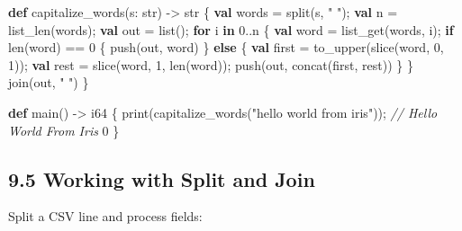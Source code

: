\documentclass[
  english,
]{book}
\newenvironment{Shaded}{\begin{snugshade}}{\end{snugshade}}
\newcommand{\CommentTok}[1]{\textcolor[rgb]{0.42,0.60,0.33}{\textit{#1}}}
\newcommand{\ControlFlowTok}[1]{\textcolor[rgb]{0.77,0.53,0.75}{\textbf{#1}}}
\newcommand{\DataTypeTok}[1]{\textcolor[rgb]{0.31,0.79,0.69}{#1}}
\newcommand{\DecValTok}[1]{\textcolor[rgb]{0.71,0.81,0.66}{#1}}
\newcommand{\FunctionTok}[1]{\textcolor[rgb]{0.86,0.86,0.67}{#1}}
\newcommand{\KeywordTok}[1]{\textcolor[rgb]{0.34,0.61,0.84}{\textbf{#1}}}
\newcommand{\NormalTok}[1]{\textcolor[rgb]{0.83,0.83,0.83}{#1}}
\newcommand{\OperatorTok}[1]{\textcolor[rgb]{0.83,0.83,0.83}{#1}}
\newcommand{\StringTok}[1]{\textcolor[rgb]{0.81,0.57,0.47}{#1}}
\begin{document}
\begin{Shaded}
\begin{Highlighting}[]
\KeywordTok{def}\NormalTok{ capitalize\_words(s: }\DataTypeTok{str}\NormalTok{) }\OperatorTok{{-}\textgreater{}} \DataTypeTok{str}\NormalTok{ \{}
    \KeywordTok{val}\NormalTok{ words }\OperatorTok{=} \FunctionTok{split}\NormalTok{(s, }\StringTok{" "}\NormalTok{);}
    \KeywordTok{val}\NormalTok{ n }\OperatorTok{=} \FunctionTok{list\_len}\NormalTok{(words);}
    \KeywordTok{val}\NormalTok{ out }\OperatorTok{=} \DataTypeTok{list}\NormalTok{();}
    \ControlFlowTok{for}\NormalTok{ i }\ControlFlowTok{in} \DecValTok{0}\OperatorTok{..}\NormalTok{n \{}
        \KeywordTok{val}\NormalTok{ word }\OperatorTok{=} \FunctionTok{list\_get}\NormalTok{(words, i);}
        \ControlFlowTok{if} \FunctionTok{len}\NormalTok{(word) }\OperatorTok{==} \DecValTok{0}\NormalTok{ \{}
            \FunctionTok{push}\NormalTok{(out, word)}
\NormalTok{        \} }\ControlFlowTok{else}\NormalTok{ \{}
            \KeywordTok{val}\NormalTok{ first }\OperatorTok{=} \FunctionTok{to\_upper}\NormalTok{(}\FunctionTok{slice}\NormalTok{(word, }\DecValTok{0}\NormalTok{, }\DecValTok{1}\NormalTok{));}
            \KeywordTok{val}\NormalTok{ rest }\OperatorTok{=} \FunctionTok{slice}\NormalTok{(word, }\DecValTok{1}\NormalTok{, }\FunctionTok{len}\NormalTok{(word));}
            \FunctionTok{push}\NormalTok{(out, }\FunctionTok{concat}\NormalTok{(first, rest))}
\NormalTok{        \}}
\NormalTok{    \}}
    \FunctionTok{join}\NormalTok{(out, }\StringTok{" "}\NormalTok{)}
\NormalTok{\}}

\KeywordTok{def}\NormalTok{ main() }\OperatorTok{{-}\textgreater{}} \DataTypeTok{i64}\NormalTok{ \{}
    \FunctionTok{print}\NormalTok{(capitalize\_words(}\StringTok{"hello world from iris"}\NormalTok{));}
    \CommentTok{// Hello World From Iris}
    \DecValTok{0}
\NormalTok{\}}
\end{Highlighting}
\end{Shaded}

\subsection{9.5 Working with Split and
Join}\label{working-with-split-and-join}

Split a CSV line and process fields:
\end{document}
